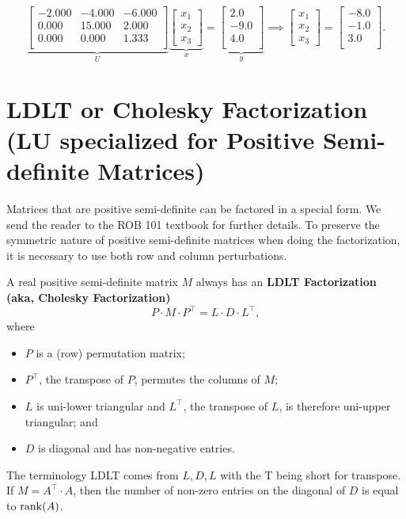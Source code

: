 $$ \underbrace{\left[
\begin{array}{rrr}
-2.000 & -4.000 & -6.000 \\
0.000 & 15.000 & 2.000 \\
0.000 & 0.000 & 1.333 \\
\end{array}
\right]}_{U} \underbrace{\begin{bmatrix}x_1 \\x_2 \\ x_3 \end{bmatrix}}_{x} =\underbrace{\left[
\begin{array}{r}
2.0 \\
-9.0 \\
4.0 \\
\end{array}
\right]}_{y} \implies\begin{bmatrix}x_1 \\x_2 \\ x_3 \end{bmatrix} = \left[
\begin{array}{r}
-8.0 \\
-1.0 \\
3.0 \\
\end{array}
\right]. $$
\Qed

\section{LDLT or Cholesky Factorization (LU specialized for Positive Semi-definite Matrices)}

Matrices that are positive semi-definite can be factored in a special form. We send the reader to the ROB 101 textbook for further details. To preserve the symmetric nature of positive semi-definite matrices when doing the factorization, it is necessary to use both row and column perturbations. 

\begin{tcolorbox}[title=\textbf{ \large Enhanced LU Factorization and Rank of a Matrix}]
A real positive semi-definite matrix $M$ always has an \textbf{LDLT Factorization (aka, Cholesky Factorization)}
\begin{equation}
    \label{eq:LDLTfactorization}
    P\cdot M \cdot P^\top = L\cdot D \cdot L^\top,
\end{equation}
where
\begin{itemize}
    \item $P$ is a (row) permutation matrix;
    \item $P^\top$, the transpose of $P$, permutes the columns of $M$;
    \item $L$ is uni-lower triangular and $L^\top$, the transpose of $L$, is therefore uni-upper triangular; and
    \item $D$ is diagonal and has non-negative entries.
\end{itemize}

The terminology LDLT comes from $L, D, L$ with the T being short for transpose. If $M=A^\top \cdot A$, then the number of non-zero entries on the diagonal of $D$ is equal to $\mathrm{rank}(A)$.
\end{tcolorbox}

